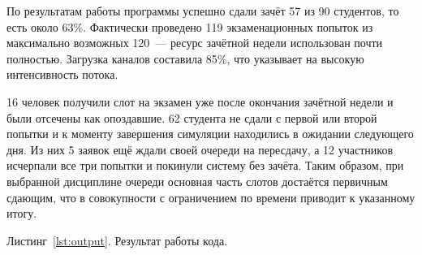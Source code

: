 \documentclass[a4paper, 14pt]{extarticle}
\begin{document}
По результатам работы программы успешно сдали зачёт 57 из 90 студентов, то есть около 63\%. Фактически проведено 119 экзаменационных попыток из максимально возможных 120~--- ресурс зачётной недели использован почти полностью. Загрузка каналов составила 85\%, что указывает на высокую интенсивность потока.

16 человек получили слот на экзамен уже после окончания зачётной недели и были отсечены как опоздавшие. 62 студента не сдали с первой или второй попытки и к моменту завершения симуляции находились в ожидании следующего дня. Из них 5 заявок ещё ждали своей очереди на пересдачу, а 12 участников исчерпали все три попытки и покинули систему без зачёта. Таким образом, при выбранной дисциплине очереди основная часть слотов достаётся первичным сдающим, что в совокупности с ограничением по времени приводит к указанному итогу.

\label{lst:output}
Листинг~\ref{lst:output}. Результат работы кода.
\end{document}
